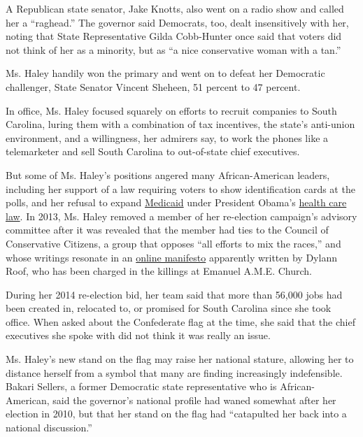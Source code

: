 A Republican state senator, Jake Knotts, also went on a radio show and
called her a ``raghead.'' The governor said Democrats, too, dealt
insensitively with her, noting that State Representative Gilda
Cobb-Hunter once said that voters did not think of her as a minority,
but as ``a nice conservative woman with a tan.''

Ms. Haley handily won the primary and went on to defeat her Democratic
challenger, State Senator Vincent Sheheen, 51 percent to 47 percent.

In office, Ms. Haley focused squarely on efforts to recruit companies to
South Carolina, luring them with a combination of tax incentives, the
state's anti-union environment, and a willingness, her admirers say, to
work the phones like a telemarketer and sell South Carolina to
out-of-state chief executives.

But some of Ms. Haley's positions angered many African-American leaders,
including her support of a law requiring voters to show identification
cards at the polls, and her refusal to expand
\href{http://topics.nytimes.com/top/news/health/diseasesconditionsandhealthtopics/medicaid/index.html?inline=nyt-classifier}{Medicaid}
under President Obama's
\href{http://topics.nytimes.com/top/news/health/diseasesconditionsandhealthtopics/health_insurance_and_managed_care/health_care_reform/index.html?inline=nyt-classifier}{health
care law}. In 2013, Ms. Haley removed a member of her re-election
campaign's advisory committee after it was revealed that the member had
ties to the Council of Conservative Citizens, a group that opposes ``all
efforts to mix the races,'' and whose writings resonate in an
\href{http://www.nytimes.com/2015/06/21/us/dylann-storm-roof-photos-website-charleston-church-shooting.html}{online
manifesto} apparently written by Dylann Roof, who has been charged in
the killings at Emanuel A.M.E. Church.

During her 2014 re-election bid, her team said that more than 56,000
jobs had been created in, relocated to, or promised for South Carolina
since she took office. When asked about the Confederate flag at the
time, she said that the chief executives she spoke with did not think it
was really an issue.

Ms. Haley's new stand on the flag may raise her national stature,
allowing her to distance herself from a symbol that many are finding
increasingly indefensible. Bakari Sellers, a former Democratic state
representative who is African-American, said the governor's national
profile had waned somewhat after her election in 2010, but that her
stand on the flag had ``catapulted her back into a national
discussion.''

